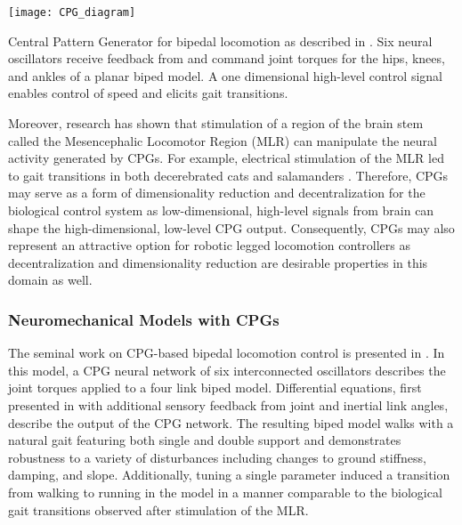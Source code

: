\begin{marginfigure}
    \centering
    \texttt{[image: CPG\_diagram]}
    \caption{Central Pattern Generator for bipedal locomotion as described in
    \citet{taga1991self}. Six neural oscillators receive feedback from and
    command joint torques for the hips, knees, and ankles of a planar biped
    model. A one dimensional high-level control signal enables control of speed
    and elicits gait transitions.}
    \label{fig:cpg_diagram}
\end{marginfigure}
Moreover, research has shown that stimulation of a region of the brain stem
called the Mesencephalic Locomotor Region (MLR) can manipulate the neural
activity generated by CPGs. For example, electrical stimulation of the MLR led
to gait transitions in both decerebrated cats \citep{shik1966control} and
salamanders \citep{cabelguen2003bimodal}.  Therefore, CPGs may serve as a form
of dimensionality reduction and decentralization for the biological control
system as low-dimensional, high-level signals from brain can shape the
high-dimensional, low-level CPG output. Consequently, CPGs may also represent
an attractive option for robotic legged locomotion controllers as
decentralization and dimensionality reduction are desirable properties in this
domain as well.

\subsubsection{Neuromechanical Models with CPGs}
The seminal work on CPG-based bipedal locomotion control is presented in
\citet{taga1991self}. In this model, a CPG neural network of six interconnected
oscillators describes the joint torques applied to a four link biped model.
Differential equations, first presented in \citet{matsuoka1987mechanisms} with
additional sensory feedback from joint and inertial link angles, describe the
output of the CPG network. The resulting biped model walks with a natural gait
featuring both single and double support and demonstrates robustness to a
variety of disturbances including changes to ground stiffness, damping, and
slope. Additionally, tuning a single parameter induced a transition from walking
to running in the model in a manner comparable to the biological gait
transitions observed after stimulation of the MLR.

